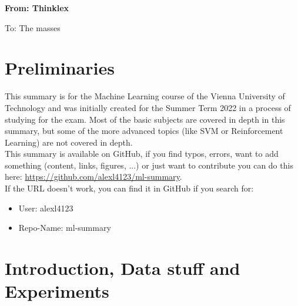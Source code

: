 \documentclass[12pt,a4paper]{article}
\newcommand{\name}{From: Thinklex}
\newcommand{\matriculation}{To: The masses}
\begin{document}
\thispagestyle{empty}
\noindent{}
\vspace{0.5cm}


\begin{center}
\textbf{\name} %

\matriculation %
\end{center}

\section{Preliminaries}

\noindent This summary is for the Machine Learning course of the Vienna University of Technology and was initially created for the Summer Term 2022 in a process of studying for the exam. Most of the basic subjects are covered in depth in this summary, but some of the more advanced topics (like SVM or Reinforcement Learning) are not covered in depth.\\
This summary is available on GitHub, if you find typos, errors, want to add something (content, links, figures, ...) or just want to contribute you can do this here: \url{https://github.com/alexl4123/ml-summary}.\\
If the URL doesn't work, you can find it in GitHub if you search for:
\begin{itemize}
    \item User: alexl4123
    \item Repo-Name: ml-summary
\end{itemize}

\newpage
\section{Introduction, Data stuff and Experiments}
\end{document}

